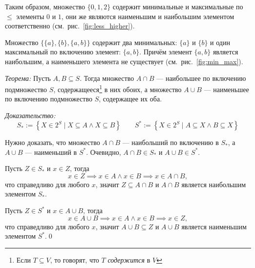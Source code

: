 Таким образом, множество $\{0,1,2\}$ содержит минимальные и максимальные по $\leq$
элементы $0$ и $1$, они же являются наименьшим и
наибольшим элементом соответственно (см.~рис.~\ref{fig:less_higher}).

Множество $\{\{a\},\{b\},\{a,b\}\}$ содержит
два минимальных: $\{a\}$ и $\{b\}$ и один максимальный
по включению элемент: $\{a,b\}$. Причём элемент $\{a,b\}$ является наибольшим, а
наименьшего элемента не существует (см.~рис.~\ref{fig:min_max}).

\pagebreak
{\it Теорема:} Пусть $A,B\subseteq S$. Тогда множество $A\cap B$ ---
наибольшее по включению подмножество $S$, содержащееся\footnote{Если $T\subseteq V$,
то говорят, что $T$ {\it содержится} в $V$} в них обоих,
а множество $A\cup B$ --- наименьшее по включению подмножество $S$,
содержащее их оба.

{\it Доказательство:}
\[
	S_{*}:=\left\{X\in 2^{S}\;\big|\; X\subseteq A\land X\subseteq B\right\}\qquad
	S^{*}:=\left\{X\in 2^{S}\;\big|\; A\subseteq X\land B\subseteq X\right\}
\]

Нужно доказать, что множество $A\cap B$ --- наибольший по включению в $S_{*}$,
а $A\cup B$ --- наименьший в $S^{*}$.
Очевидно, $A\cap B\in S_{*}$ и $A\cup B\in S^{*}$.

Пусть $Z\in S_{*}$ и $x\in Z$, тогда
\[
	x\in Z\implies x\in A\land x\in B\implies x\in A\cap B,
\]
что справедливо для любого $x$,
значит $Z\subseteq A\cap B$ и $A\cap B$ является наибольшим элементом $S_{*}$.

Пусть $Z\in S^{*}$ и $x\in A\cup B$, тогда
\[
	x\in A\cup B\implies x\in A\land x\in B\implies x\in Z,
\]
что справедливо для любого $x$,
значит $A\cup B\subseteq Z$ и $A\cup B$ является наименьшим элементом $S^{*}$.\qed

